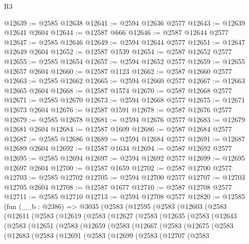 \begin{lexlean}{R3}
\begin{coremodule}
@12639 := @2585 @12638
@12641 := @2594 @12636 @2577
@12643 := @12639 @12641 @2604
@12644 := @12587 @666
@12646 := @2587 @12644 @2577
@12647 := @2585 @12646
@12649 := @2594 @12644 @2577
@12651 := @12647 @12649 @2604
@12652 := @12587 @1539
@12654 := @2587 @12652 @2577
@12655 := @2585 @12654
@12657 := @2594 @12652 @2577
@12659 := @12655 @12657 @2604
@12660 := @12587 @1123
@12662 := @2587 @12660 @2577
@12663 := @2585 @12662
@12665 := @2594 @12660 @2577
@12667 := @12663 @12665 @2604
@12668 := @12587 @1574
@12670 := @2587 @12668 @2577
@12671 := @2585 @12670
@12673 := @2594 @12668 @2577
@12675 := @12671 @12673 @2604
@12676 := @12587 @1591
@12678 := @2587 @12676 @2577
@12679 := @2585 @12678
@12681 := @2594 @12676 @2577
@12683 := @12679 @12681 @2604
@12684 := @12587 @1609
@12686 := @2587 @12684 @2577
@12687 := @2585 @12686
@12689 := @2594 @12684 @2577
@12691 := @12687 @12689 @2604
@12692 := @12587 @1634
@12694 := @2587 @12692 @2577
@12695 := @2585 @12694
@12697 := @2594 @12692 @2577
@12699 := @12695 @12697 @2604
@12700 := @12587 @1659
@12702 := @2587 @12700 @2577
@12703 := @2585 @12702
@12705 := @2594 @12700 @2577
@12707 := @12703 @12705 @2604
@12708 := @12587 @1677
@12710 := @2587 @12708 @2577
@12711 := @2585 @12710
@12713 := @2594 @12708 @2577
@12820 := @12585
    (fun (__b : @2386) =>
    @3035
      (@2583
        (@12595
          (@2583
            (@12603
              (@2583
                (@12611
                  (@2583
                    (@12619
                      (@2583
                        (@12627
                          (@2583
                            (@12635
                              (@2583
                                (@12643
                                  (@2583
                                    (@12651
                                      (@2583
                                        (@12659
                                          (@2583
                                            (@12667
                                              (@2583
                                                (@12675
                                                  (@2583
                                                    (@12683
                                                      (@2583
                                                        (@12691
                                                          (@2583
                                                            (@12699
                                                              (@2583
                                                                (@12707
                                                                  (@2583

\end{coremodule}
\end{lexlean}
